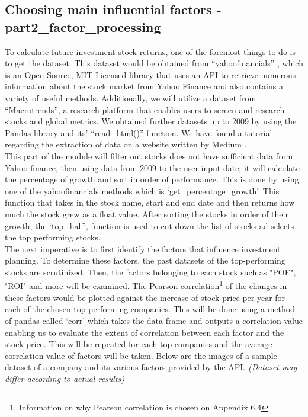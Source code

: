 \documentclass[fontsize=11pt]{article}
\begin{document}
\subsection{Choosing main influential factors - part2\_factor\_processing}
To calculate future investment stock returns, one of the foremost things to do is to get the dataset. This dataset would be obtained from “yahoofinancials” \cite{jecsandyahoo}, which is an Open Source, MIT Licensed library that uses an API to retrieve numerous information about the stock market from Yahoo Finance \cite{yahoofinancials}and also contains a variety of useful methods. Additionally, we will utilize a dataset from “Macrotrends”\cite{macrotrends}, a research platform that enables users to screen and research stocks and global metrics. We obtained further datasets up to 2009 by using the Pandas library\cite{pandas} and its’ “read\_html()” function. We have found a tutorial regarding the extraction of data on a website written by Medium \cite{tballz2022retrieving}.\\

This part of the module will filter out stocks does not have sufficient data from Yahoo finance, then using data from 2009 to the user input date, it will calculate the percentage of growth and sort in order of performance. This is done by using one of the yahoofinancials methods which is `get\_percentage\_growth'. This function that takes in the stock name, start and end date and then returns how much the stock grew as a float value. After sorting the stocks in order of their growth, the `top\_half', function is used to cut down the list of stocks ad selects the top performing stocks.\\

The next imperative is to first identify the factors that influence investment planning. To determine these factors, the past datasets of the top-performing stocks are scrutinized. Then, the factors belonging to each stock such as "POE", "ROI" and more will be examined. The Pearson correlation\footnote{Information on why Pearson correlation is chosen on Appendix 6.4} of the changes in these factors would be plotted against the increase of stock price per year for each of the chosen top-performing companies. This will be done using a method of pandas\cite{pandascorr} called `corr' which takes the data frame and outputs a correlation value enabling us to evaluate the extent of correlation between each factor and the stock price.
This will be repeated for each top companies and the average correlation value of factors will be taken. Below are the images of a sample dataset of a company and its various factors provided by the API. \textit{(Dataset may differ according to actual results)} \\
\end{document}
